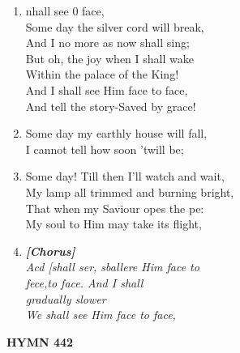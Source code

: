 \documentclass[11pt,a4paper]{article}
\begin{document}
\begin{enumerate}
    \item nhall see 0 face, \\
        Some day the silver cord will break, \\
        And I no more as now shall sing; \\
        But oh, the joy when I shall wake \\
        Within the palace of the King! \\
        And I shall see Him face to face, \\
        And tell the story-Saved by grace!

    \item Some day my earthly house will fall, \\
        I cannot tell how soon 'twill be;

    \item Some day! Till then I'll watch and wait, \\
        My lamp all trimmed and burning bright, \\
        That when my Saviour opes the pe: \\
        My soul to Him may take its flight,

    \item[] \vspace{0.4em}
    \textbf{\textit{[Chorus]}} \\
    \textit{Acd [shall ser, sballere Him face to \\
        fece,to face. And I shall \\
        gradually slower \\
        We shall see Him face to face,}
    \vspace{0.4em}

\end{enumerate}

\newpage
\begin{center}
    {\Large \textbf{HYMN 442}}
\end{center}
\vspace{1em}
\end{document}
